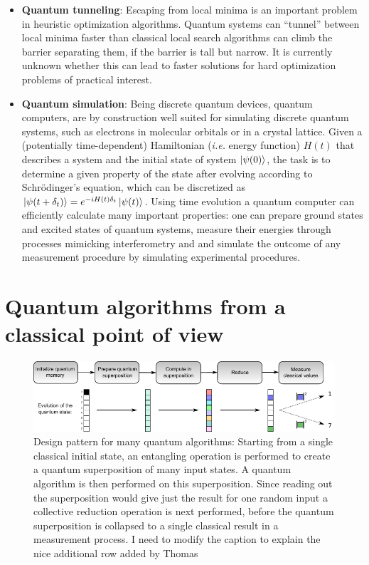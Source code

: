 \documentclass[journal]{IEEEtran}
\begin{document}
\begin{itemize}
\item   {\bf Quantum tunneling}: Escaping from local minima is an important problem in heuristic optimization algorithms. Quantum systems can ``tunnel'' between local minima faster than classical local search algorithms can climb the barrier separating them, if the barrier is tall but narrow. It is currently unknown whether this can lead to faster solutions for hard optimization problems of practical interest.

\item   {\bf Quantum simulation}: Being discrete quantum devices, quantum computers, are by construction well suited for simulating discrete quantum systems, such as electrons in molecular orbitals or in a crystal lattice. Given a (potentially time-dependent) Hamiltonian ({\it i.e.} energy function) $H(t)$ that describes a system and the initial state of system $\ket{\psi(0)}$, the task is to determine a given property of the state after evolving according to Schr\"odinger's equation, which can be discretized as  $\ket{\psi(t+\delta_t)}=e^{-iH(t)\delta_t}\ket{\psi(t)}$. Using time evolution a quantum computer can efficiently  calculate many important properties: one can prepare ground states and excited states of quantum systems, measure their energies through processes mimicking interferometry and and simulate the outcome of any measurement procedure by simulating experimental procedures.


\end{itemize}

\section{Quantum algorithms from a classical point of view}
\label{sec:box3}

\begin{figure}[t]
\centering
\includegraphics[width=\textwidth]{figures/simd}
\caption{Design pattern for many quantum algorithms: Starting from a single classical initial state, an entangling operation is performed to create a quantum superposition of many input states. A quantum algorithm is then performed on this superposition. Since reading out the superposition would give just the result for one random input a collective reduction operation is next performed, before the quantum superposition is collapsed to a single classical result in a measurement process. {\color{red} I need to modify the caption to explain the nice additional row added by Thomas} }
\label{fig:simd}
\end{figure}
\end{document}
